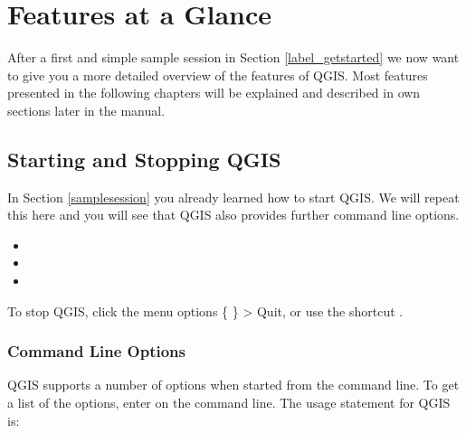 
\chapter{Features at a Glance}\label{feature_glance}


After a first and simple sample session in Section \ref{label_getstarted} we now 
want to give you a more detailed overview of the features of QGIS. 
Most features presented in the following chapters will be explained and described in 
own sections later in the manual.

\section{Starting and Stopping QGIS}\label{label_startinqgis}

In Section \ref{samplesession} you already learned how to start QGIS. We will 
repeat this here and you will see that QGIS also provides further command line options. 

\begin{itemize}
\item {} 
\item {}
\item {}
\end{itemize} 

To stop QGIS, click the menu options \{\nix{} \} > Quit,
or use the shortcut .

\subsection{Command Line Options}
\label{label_commandline}

\nix QGIS supports a number of options when started from the command line. To
get a list of the options, enter  on the command line.
The usage statement for QGIS is:

